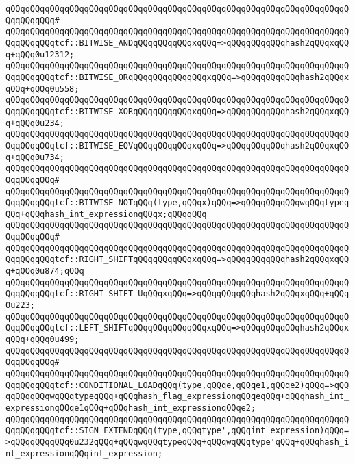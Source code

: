 \verb|qQQqqQQqqQQqqQQqqQQqqQQqqQQqqQQqqQQqqQQqqQQqqQQqqQQqqQQqqQQqqQQqqQQqqQQqqQQqqQQq#|\newline
\verb|qQQqqQQqqQQqqQQqqQQqqQQqqQQqqQQqqQQqqQQqqQQqqQQqqQQqqQQqqQQqqQQqqQQqqQQqqQQqqQQqtcf::BITWISE_ANDqQQqqQQqqQQqxqQQq=>qQQqqQQqqQQqhash2qQQqxqQQq+qQQq0u12312;|\newline
\verb|qQQqqQQqqQQqqQQqqQQqqQQqqQQqqQQqqQQqqQQqqQQqqQQqqQQqqQQqqQQqqQQqqQQqqQQqqQQqqQQqtcf::BITWISE_ORqQQqqQQqqQQqqQQqxqQQq=>qQQqqQQqqQQqhash2qQQqxqQQq+qQQq0u558;|\newline
\verb|qQQqqQQqqQQqqQQqqQQqqQQqqQQqqQQqqQQqqQQqqQQqqQQqqQQqqQQqqQQqqQQqqQQqqQQqqQQqqQQqtcf::BITWISE_XORqQQqqQQqqQQqxqQQq=>qQQqqQQqqQQqhash2qQQqxqQQq+qQQq0u234;|\newline
\verb|qQQqqQQqqQQqqQQqqQQqqQQqqQQqqQQqqQQqqQQqqQQqqQQqqQQqqQQqqQQqqQQqqQQqqQQqqQQqqQQqtcf::BITWISE_EQVqQQqqQQqqQQqxqQQq=>qQQqqQQqqQQqhash2qQQqxqQQq+qQQq0u734;|\newline
\verb|qQQqqQQqqQQqqQQqqQQqqQQqqQQqqQQqqQQqqQQqqQQqqQQqqQQqqQQqqQQqqQQqqQQqqQQqqQQqqQQq#|\newline
\verb|qQQqqQQqqQQqqQQqqQQqqQQqqQQqqQQqqQQqqQQqqQQqqQQqqQQqqQQqqQQqqQQqqQQqqQQqqQQqqQQqtcf::BITWISE_NOTqQQq(type,qQQqx)qQQq=>qQQqqQQqqQQqwqQQqtypeqQQq+qQQqhash_int_expressionqQQqx;qQQqqQQq|\newline
\verb|qQQqqQQqqQQqqQQqqQQqqQQqqQQqqQQqqQQqqQQqqQQqqQQqqQQqqQQqqQQqqQQqqQQqqQQqqQQqqQQq#|\newline
\verb|qQQqqQQqqQQqqQQqqQQqqQQqqQQqqQQqqQQqqQQqqQQqqQQqqQQqqQQqqQQqqQQqqQQqqQQqqQQqqQQqtcf::RIGHT_SHIFTqQQqqQQqqQQqxqQQq=>qQQqqQQqqQQqhash2qQQqxqQQq+qQQq0u874;qQQq|\newline
\verb|qQQqqQQqqQQqqQQqqQQqqQQqqQQqqQQqqQQqqQQqqQQqqQQqqQQqqQQqqQQqqQQqqQQqqQQqqQQqqQQqtcf::RIGHT_SHIFT_UqQQqxqQQq=>qQQqqQQqqQQqhash2qQQqxqQQq+qQQq0u223;|\newline
\verb|qQQqqQQqqQQqqQQqqQQqqQQqqQQqqQQqqQQqqQQqqQQqqQQqqQQqqQQqqQQqqQQqqQQqqQQqqQQqqQQqtcf::LEFT_SHIFTqQQqqQQqqQQqqQQqxqQQq=>qQQqqQQqqQQqhash2qQQqxqQQq+qQQq0u499;|\newline
\verb|qQQqqQQqqQQqqQQqqQQqqQQqqQQqqQQqqQQqqQQqqQQqqQQqqQQqqQQqqQQqqQQqqQQqqQQqqQQqqQQq#|\newline
\verb|qQQqqQQqqQQqqQQqqQQqqQQqqQQqqQQqqQQqqQQqqQQqqQQqqQQqqQQqqQQqqQQqqQQqqQQqqQQqqQQqtcf::CONDITIONAL_LOADqQQq(type,qQQqe,qQQqe1,qQQqe2)qQQq=>qQQqqQQqqQQqwqQQqtypeqQQq+qQQqhash_flag_expressionqQQqeqQQq+qQQqhash_int_expressionqQQqe1qQQq+qQQqhash_int_expressionqQQqe2;|\newline
\verb|qQQqqQQqqQQqqQQqqQQqqQQqqQQqqQQqqQQqqQQqqQQqqQQqqQQqqQQqqQQqqQQqqQQqqQQqqQQqqQQqtcf::SIGN_EXTENDqQQq(type,qQQqtype',qQQqint_expression)qQQq=>qQQqqQQqqQQq0u232qQQq+qQQqwqQQqtypeqQQq+qQQqwqQQqtype'qQQq+qQQqhash_int_expressionqQQqint_expression;|\newline

